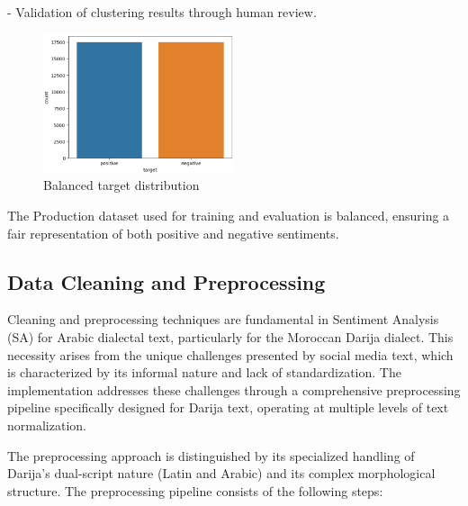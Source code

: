 \documentclass[a4paper,40pt,twocolumn]{article}
\begin{document}
    - Validation of clustering results through human review.

    \begin{figure}[h!]
    \hspace{-1cm}
    \centering
    \includegraphics[width=0.5\textwidth]{data.png}
    \caption{Balanced target distribution}
    \label{fig:architecture}
    \end{figure}

    
The Production dataset used for training and evaluation is balanced, ensuring a fair representation of both positive and negative sentiments.


\subsection{Data Cleaning and Preprocessing}
Cleaning and preprocessing techniques are fundamental in Sentiment Analysis (SA) for Arabic dialectal text, particularly for the Moroccan Darija dialect. This necessity arises from the unique challenges presented by social media text, which is characterized by its informal nature and lack of standardization. The implementation addresses these challenges through a comprehensive preprocessing pipeline specifically designed for Darija text, operating at multiple levels of text normalization.

The preprocessing approach is distinguished by its specialized handling of Darija's dual-script nature (Latin and Arabic) and its complex morphological structure. The preprocessing pipeline consists of the following steps:
\end{document}

